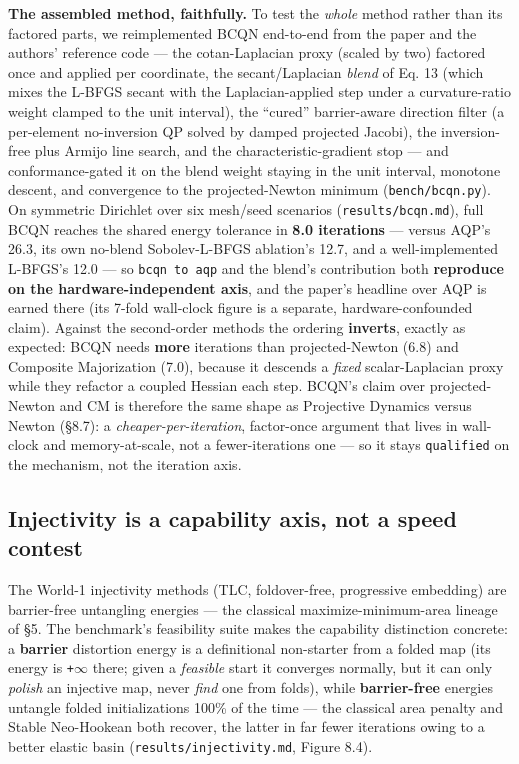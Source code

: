 \documentclass{egpubl}
\begin{document}
\textbf{The assembled method, faithfully.} To test the \emph{whole} method rather than its factored parts, we
reimplemented BCQN end-to-end from the paper and the authors' reference code --- the cotan-Laplacian
proxy (scaled by two) factored once and applied per coordinate, the secant/Laplacian \emph{blend} of
Eq. 13 (which mixes the L-BFGS secant with the Laplacian-applied step under a curvature-ratio weight
clamped to the unit interval), the ``cured'' barrier-aware direction filter (a per-element no-inversion
QP solved by damped projected Jacobi), the inversion-free plus Armijo line search, and the
characteristic-gradient stop --- and conformance-gated it on the blend weight staying in the unit
interval, monotone descent, and convergence to the projected-Newton minimum (\texttt{bench/bcqn.py}). On
symmetric Dirichlet over six mesh/seed scenarios (\texttt{results/bcqn.md}), full BCQN reaches the shared
energy tolerance in \textbf{8.0 iterations} --- versus AQP's 26.3, its own no-blend Sobolev-L-BFGS ablation's
12.7, and a well-implemented L-BFGS's 12.0 --- so \texttt{bcqn to aqp} and the blend's contribution both
\textbf{reproduce on the hardware-independent axis}, and the paper's headline over AQP is earned there (its
7-fold wall-clock figure is a separate, hardware-confounded claim). Against the second-order methods
the ordering \textbf{inverts}, exactly as expected: BCQN needs \textbf{more} iterations than projected-Newton
(6.8) and Composite Majorization (7.0), because it descends a \emph{fixed} scalar-Laplacian proxy while they
refactor a coupled Hessian each step. BCQN's claim over projected-Newton and CM is therefore the same
shape as Projective Dynamics versus Newton (\S8.7): a \emph{cheaper-per-iteration}, factor-once argument that
lives in wall-clock and memory-at-scale, not a fewer-iterations one --- so it stays
\texttt{qualified} on the mechanism, not the iteration axis.

\subsection{Injectivity is a capability axis, not a speed contest}

The World-1 injectivity methods (TLC, foldover-free, progressive embedding) are barrier-free untangling
energies --- the classical maximize-minimum-area lineage of \S5. The benchmark's feasibility suite makes
the capability distinction concrete: a \textbf{barrier} distortion energy is a definitional non-starter from
a folded map (its energy is \texttt{+$\infty$} there; given a \emph{feasible} start it converges normally, but it can
only \emph{polish} an injective map, never \emph{find} one from folds), while \textbf{barrier-free} energies untangle
folded initializations 100\% of the time --- the classical area penalty and Stable Neo-Hookean both
recover, the latter in far fewer iterations owing to a better elastic basin (\texttt{results/injectivity.md},
Figure 8.4).
\end{document}
